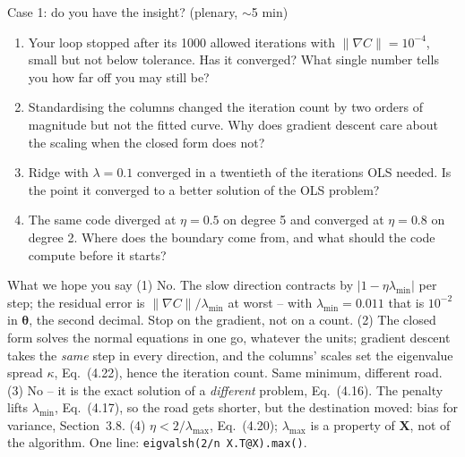 \documentclass[10pt,aspectratio=169]{beamer}
\newcounter{insight}
\begin{document}
\begin{frame}{Case 1: do you have the insight?  (plenary, $\sim$5 min)}
\small
\begin{enumerate}
  \item Your loop stopped after its 1000 allowed iterations with
        $\|\nabla C\|=10^{-4}$, small but not below tolerance.  Has it
        converged?  What single number tells you how far off you may still be?
  \item Standardising the columns changed the iteration count by two orders
        of magnitude but not the fitted curve.  Why does gradient descent care
        about the scaling when the closed form does not?
  \item Ridge with $\lambda=0.1$ converged in a twentieth of the iterations
        OLS needed.  Is the point it converged to a better solution of the
        OLS problem?
  \item The same code diverged at $\eta=0.5$ on degree 5 and converged at
        $\eta=0.8$ on degree 2.  Where does the boundary come from, and what
        should the code compute before it starts?
\end{enumerate}
\pause
\begin{block}{What we hope you say}
\footnotesize
(1) No.  The slow direction contracts by $|1-\eta\lambda_{\min}|$ per step;
the residual error is $\|\nabla C\|/\lambda_{\min}$ at worst -- with
$\lambda_{\min}=0.011$ that is $10^{-2}$ in $\bm{\theta}$, the second decimal.
Stop on the gradient, not on a count.
(2) The closed form solves the normal equations in one go, whatever the
units; gradient descent takes the \emph{same} step in every direction, and
the columns' scales set the eigenvalue spread $\kappa$, Eq.~(4.22), hence the
iteration count.  Same minimum, different road.
(3) No -- it is the exact solution of a \emph{different} problem, Eq.~(4.16).
The penalty lifts $\lambda_{\min}$, Eq.~(4.17), so the road gets shorter, but
the destination moved: bias for variance, Section~3.8.
(4) $\eta<2/\lambda_{\max}$, Eq.~(4.20); $\lambda_{\max}$ is a property of
$\bm{X}$, not of the algorithm.  One line: \texttt{eigvalsh(2/n X.T@X).max()}.
\end{block}
\end{frame}
\end{document}
